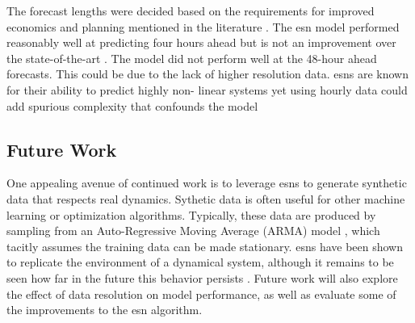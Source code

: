 The forecast lengths were decided based on the requirements for improved
economics and planning mentioned in the literature
 \cite{wang_quantifying_2016,mc_garrigle_quantifying_2015,brancucci_martinez-anido_value_2016}. The \gls{esn} model performed reasonably well at predicting
 four hours ahead but is not an improvement over the state-of-the-art
 \cite{wang_quantifying_2016,powers_weather_2017}. The model did not perform
 well at the 48-hour ahead forecasts. This could be due to the lack of higher
 resolution data. \glspl{esn} are known for their ability to predict highly non-
 linear systems \cite{jaeger_harnessing_2004,lukosevicius_reservoir_2009} yet
 using hourly data could add spurious complexity that confounds the model
 \cite{garland_model-free_2014}

\subsection{Future Work}
One appealing avenue of continued work is to leverage \glspl{esn} to generate
synthetic data that respects real dynamics. Sythetic data is often useful for
other machine learning or optimization algorithms. Typically, these data are
produced by sampling from an Auto-Regressive Moving Average (ARMA) model \cite{baker_optimal_2018, garcia_dynamic_2016}, which tacitly assumes the
training data can be made stationary. \glspl{esn} have been shown to replicate
the environment of a dynamical system, although it remains to be seen how far
in the future this behavior persists \cite{pathak_using_2017,pathak_model-free_2018}.
Future work will also explore the effect of data resolution on model
performance, as well as evaluate some of the improvements to the \gls{esn}
algorithm.
